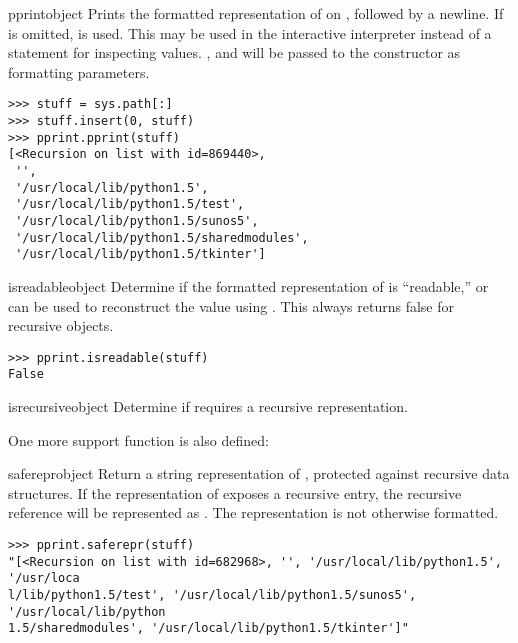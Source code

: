 \begin{funcdesc}{pprint}{object}
Prints the formatted representation of  on ,
followed by a newline.  If  is omitted, 
is used.  This may be used in the interactive interpreter instead of a
 statement for inspecting values.    ,
 and  will be passed to the 
constructor as formatting parameters.

\begin{verbatim}
>>> stuff = sys.path[:]
>>> stuff.insert(0, stuff)
>>> pprint.pprint(stuff)
[<Recursion on list with id=869440>,
 '',
 '/usr/local/lib/python1.5',
 '/usr/local/lib/python1.5/test',
 '/usr/local/lib/python1.5/sunos5',
 '/usr/local/lib/python1.5/sharedmodules',
 '/usr/local/lib/python1.5/tkinter']
\end{verbatim}
\end{funcdesc}

\begin{funcdesc}{isreadable}{object}
Determine if the formatted representation of  is
``readable,'' or can be used to reconstruct the value using
.  This always returns false for
recursive objects.

\begin{verbatim}
>>> pprint.isreadable(stuff)
False
\end{verbatim}
\end{funcdesc}

\begin{funcdesc}{isrecursive}{object}
Determine if  requires a recursive representation.
\end{funcdesc}


One more support function is also defined:

\begin{funcdesc}{saferepr}{object}
Return a string representation of , protected against
recursive data structures.  If the representation of 
exposes a recursive entry, the recursive reference will be represented
as .  The
representation is not otherwise formatted.
\end{funcdesc}

\begin{verbatim}
>>> pprint.saferepr(stuff)
"[<Recursion on list with id=682968>, '', '/usr/local/lib/python1.5', '/usr/loca
l/lib/python1.5/test', '/usr/local/lib/python1.5/sunos5', '/usr/local/lib/python
1.5/sharedmodules', '/usr/local/lib/python1.5/tkinter']"
\end{verbatim}


